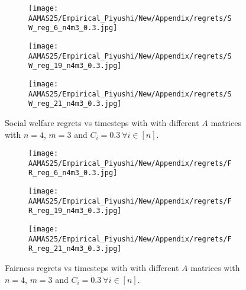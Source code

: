 \begin{figure*}[ht!]
\centering
\begin{subfigure}{.33\textwidth}
    \centering
    \texttt{[image: AAMAS25/Empirical\_Piyushi/New/Appendix/regrets/SW\_reg\_6\_n4m3\_0.3.jpg]}  
\end{subfigure}  
\begin{subfigure}{.33\textwidth}
    \centering
    \texttt{[image: AAMAS25/Empirical\_Piyushi/New/Appendix/regrets/SW\_reg\_19\_n4m3\_0.3.jpg]}  
\end{subfigure}  
\begin{subfigure}{.33\textwidth}
    \centering
    \texttt{[image: AAMAS25/Empirical\_Piyushi/New/Appendix/regrets/SW\_reg\_21\_n4m3\_0.3.jpg]}  
\end{subfigure}  
\caption{Social welfare regrets vs timesteps with with different $A$ matrices with $n=4$, $m=3$ and $C_i=0.3\ \forall i \in [n]$.}\label{app:sw_43_0.3}
\end{figure*}

\begin{figure*}[ht!]
\centering
\begin{subfigure}{.33\textwidth}
    \centering
    \texttt{[image: AAMAS25/Empirical\_Piyushi/New/Appendix/regrets/FR\_reg\_6\_n4m3\_0.3.jpg]}  
\end{subfigure}  
\begin{subfigure}{.33\textwidth}
    \centering
    \texttt{[image: AAMAS25/Empirical\_Piyushi/New/Appendix/regrets/FR\_reg\_19\_n4m3\_0.3.jpg]}  
\end{subfigure}  
\begin{subfigure}{.33\textwidth}
    \centering
    \texttt{[image: AAMAS25/Empirical\_Piyushi/New/Appendix/regrets/FR\_reg\_21\_n4m3\_0.3.jpg]}  
\end{subfigure}  
\caption{Fairness regrets vs timesteps with with different $A$ matrices with $n=4$, $m=3$ and $C_i=0.3\ \forall i \in [n]$.}\label{app:fr_43_0.3}
\end{figure*}

